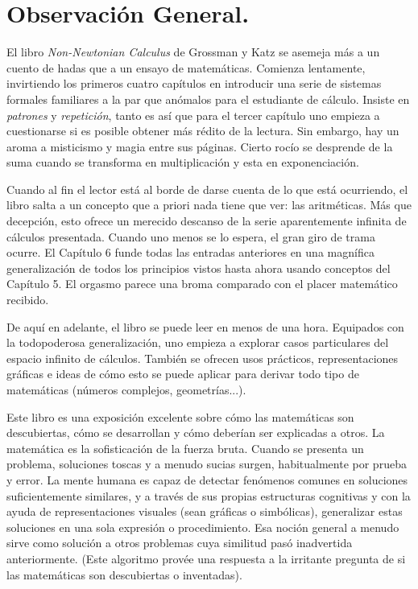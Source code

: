 \section{Observación General.}

El libro \textit{Non-Newtonian Calculus} de Grossman y Katz se asemeja más a un cuento de hadas que a un ensayo de matemáticas. Comienza lentamente, invirtiendo los primeros cuatro capítulos en introducir una serie de sistemas formales familiares a la par que anómalos para el estudiante de cálculo. Insiste en \textit{patrones} y \textit{repetición}, tanto es así que para el tercer capítulo uno empieza a cuestionarse si es posible obtener más rédito de la lectura. Sin embargo, hay un aroma a misticismo y magia entre sus páginas. Cierto rocío se desprende de la suma cuando se transforma en multiplicación y esta en exponenciación.

Cuando al fin el lector está al borde de darse cuenta de lo que está ocurriendo, el libro salta a un concepto que a priori nada tiene que ver: las aritméticas. Más que decepción, esto ofrece un merecido descanso de la serie aparentemente infinita de cálculos presentada. Cuando uno menos se lo espera, el gran giro de trama ocurre. El Capítulo 6 funde todas las entradas anteriores en una magnífica generalización de todos los principios vistos hasta ahora usando conceptos del Capítulo 5. El orgasmo parece una broma comparado con el placer matemático recibido. 

De aquí en adelante, el libro se puede leer en menos de una hora. Equipados con la todopoderosa generalización, uno empieza a explorar casos particulares del espacio infinito de cálculos. También se ofrecen usos prácticos, representaciones gráficas e ideas de cómo esto se puede aplicar para derivar todo tipo de matemáticas (números complejos, geometrías...).

Este libro es una exposición excelente sobre cómo las matemáticas son descubiertas, cómo se desarrollan y cómo deberían ser explicadas a otros. La matemática es la sofisticación de la fuerza bruta. Cuando se presenta un problema, soluciones toscas y a menudo sucias surgen, habitualmente por prueba y error. La mente humana es capaz de detectar fenómenos comunes en soluciones suficientemente similares, y a través de sus propias estructuras cognitivas y con la ayuda de representaciones visuales (sean gráficas o simbólicas), generalizar estas soluciones en una sola expresión o procedimiento. Esa noción general a menudo sirve como solución a otros problemas cuya similitud pasó inadvertida anteriormente. (Este algoritmo provée una respuesta a la irritante pregunta de si las matemáticas son descubiertas o inventadas).

